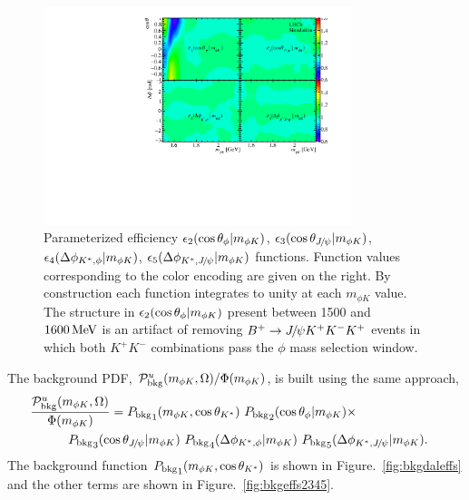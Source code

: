 \begin{figure}[bthp]
  \begin{center}
    \includegraphics[width=0.8\textwidth]{Figures/03_Zcs/05_Likelihood/effAngles} 
  \end{center}
  \vskip-0.3cm\caption{\small
     Parameterized efficiency 
     $\epsilon_2(\cos\theta_{\phi}|m_{\phi K})$, $\epsilon_3(\cos\theta_{{{J\mskip -3mu/\mskip -2mu\psi}}}|m_{\phi K})$,  
     $\epsilon_4(\Delta{\phi}_{{{K}^*},\phi}|m_{\phi K})$, $\epsilon_5(\Delta{\phi}_{{{K}^*},{{J\mskip -3mu/\mskip -2mu\psi}}}|m_{\phi K})$
     functions.
     Function values corresponding to the color encoding are given on the right.
     By construction each function integrates to unity at each $m_{\phi K}$ value.  
     The structure in $\epsilon_2(\cos\theta_{\phi}|m_{\phi K})$ present 
     between 1500 and $1600 \text{\,Me\kern -0.1em V}$ is an artifact of 
     removing ${{{B}^+}} \rightarrow {\ensuremath{{J\mskip -3mu/\mskip -2mu\psi}}} K^+ K^- K^+$ events in which both $K^+K^-$ combinations 
     pass the $\phi$ mass selection window. 
  }\label{fig:effepsilon2345}
\end{figure}

The background PDF, ${\cal P}_{\rm bkg}^{u}(m_{\phi K},\Omega)/\Phi(m_{\phi K})$, 
is built using the same approach,
\begin{equation}
\begin{split}
\lefteqn{
\frac{{\PDF_{\rm bkg}^{u}}(m_{\phi K},\Omega)}{\Phi(m_{\phi K})}=
{P_{\rm bkg}}_1(m_{\phi K},\cosks)\,\,{P_{\rm bkg}}_2(\cosphi|m_{\phi K})\times}
\\%
&\quad\quad\quad{P_{\rm bkg}}_3(\cospsi|m_{\phi K})\,\, {P_{\rm bkg}}_4(\phiksphi|m_{\phi K})\,\,{P_{\rm bkg}}_5(\phikspsi|m_{\phi K}).
\end{split}
\label{eq:pbkg}
\end{equation}
The background function ${P_{\rm bkg}}_1(m_{\phi K},\cos\theta_{{K}^*})$ is 
shown in Figure.~\ref{fig:bkgdaleffs} and the other terms are shown in 
Figure.~\ref{fig:bkgeffs2345}.

